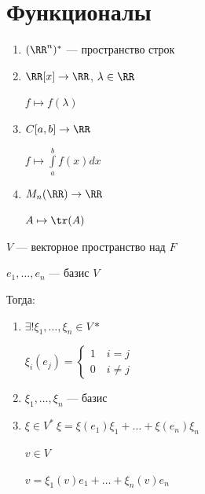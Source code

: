 \section{Функционалы}


\begin{example}{}{}
    \begin{enumerate}
        \item
            \( (\RR^n)^* \) --- пространство строк
        \item
            \( \RR[x] \to \RR \), \( \lambda \in \RR \)

            \( f \mapsto f(\lambda) \)
        \item
            \( C[a, b] \to \RR \)

            \( f \mapsto \int\limits_{a}^{b} f(x) dx \)
        \item
            \( M_n (\RR) \to \RR \)

            \( A \mapsto \tr (A) \)
    \end{enumerate}
\end{example}

\begin{lemma}{}{}
    \( V \) --- векторное пространство над \( F \)

    \( e_1, \ldots, e_n \) --- базис \( V \)

    Тогда:
    \begin{enumerate}
        \item
            \( \exists! \xi_1, \ldots, \xi_n \in V* \)

            \(
                \xi_i (e_j) = \begin{cases}
                    1 \quad i = j 
                    \\
                    0 \quad i \neq j
                \end{cases}
            \)
        \item
            \( \xi_1, \ldots, \xi_n \) --- базис
        \item
            \( \xi \in V^* \ \xi = \xi (e_1) \xi_1 + \ldots + \xi (e_n) \xi_n \)

            \( v \in V \)

            \( v = \xi_1 (v) e_1 + \ldots + \xi_n(v) e_n \)
    \end{enumerate}
\end{lemma}


